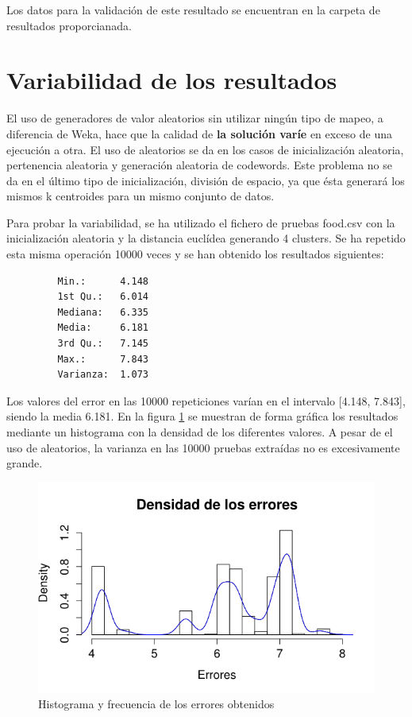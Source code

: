 \documentclass[a4paper]{report}
\begin{document}
		Los datos para la validación de este resultado se encuentran en la carpeta de resultados proporcianada.
		
	\section{Variabilidad de los resultados}
	
	El uso de generadores de valor aleatorios sin utilizar ningún tipo de mapeo, a diferencia de Weka, hace que la calidad de \textbf{la solución varíe} en exceso de una ejecución a otra. El uso de aleatorios se da en los casos de inicialización aleatoria, pertenencia aleatoria y generación aleatoria de codewords. Este problema no se da en el último tipo de inicialización, división de espacio, ya que ésta generará los mismos k centroides para un mismo conjunto de datos.
	
	Para probar la variabilidad, se ha utilizado el fichero de pruebas food.csv con la inicialización aleatoria y la distancia euclídea generando 4 clusters. Se ha repetido esta misma operación 10000 veces y se han obtenido los resultados siguientes:
	
	\begin{verbatim}
	     Min.:      4.148 
	     1st Qu.:   6.014 
	     Mediana:   6.335 
	     Media:     6.181 
	     3rd Qu.:   7.145 
	     Max.:      7.843
	     Varianza:  1.073
	\end{verbatim}
	
	Los valores del error en las 10000 repeticiones varían en el intervalo [4.148, 7.843], siendo la media 6.181. En la figura \ref{fig:error} se muestran de forma gráfica los resultados mediante un histograma con la densidad de los diferentes valores. A pesar de el uso  de aleatorios, la varianza en las 10000 pruebas extraídas no es excesivamente grande.
	
	\begin{figure}[!h]
		\centering
		\includegraphics[width=\textwidth]{./Figuras/Densidad.png}
		\caption{Histograma y frecuencia de los errores obtenidos}
		\label{fig:error}
	\end{figure}
	
\end{document}
